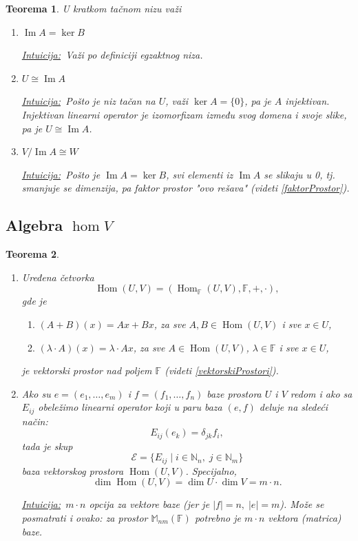 \documentclass[a4paper,12pt,twoside]{report}
\newtheorem{theorem}{Teorema}[section]
\numberwithin{algorithm}{section}
\newcommand{\intuicija}{\noindent\underline{\textit{Intuicija:}}\ }
\begin{document}
\begin{theorem}
    U kratkom tačnom nizu važi
    \begin{enumerate}
        \item $\operatorname{Im} A = \ker B$
        
        \intuicija Važi po definiciji egzaktnog niza.
        \item $U \cong \operatorname{Im} A$
        
        \intuicija Pošto je niz tačan na $U$, važi $\ker A = \{0\}$, pa je $A$ injektivan. Injektivan linearni operator je izomorfizam između svog domena i svoje slike, pa je $U \cong \operatorname{Im} A$.
        
        \item $V/\operatorname{Im} A \cong W$
        
        \intuicija Pošto je $\operatorname{Im} A = \ker B$, svi elementi iz $\operatorname{Im}A$ se slikaju u 0, tj. smanjuje se dimenzija, pa faktor prostor "ovo rešava" (videti \ref{faktorProstor}).
    \end{enumerate}
\end{theorem}

\subsection{Algebra $\hom V$}
\begin{theorem}\
    \begin{enumerate}
        \item Uređena četvorka 
        \[
        \operatorname{Hom}(U, V) = (\operatorname{Hom}_{\mathbb{F}}(U, V), \mathbb{F}, +, \cdot),
        \]
        gde je
        \begin{enumerate}
            \item[(a)] $(A + B)(x) = Ax + Bx$, za sve $A, B \in \operatorname{Hom}(U, V)$ i sve $x \in U$,
            \item[(b)] $(\lambda \cdot A)(x) = \lambda \cdot Ax$, za sve $A \in \operatorname{Hom}(U, V)$, $\lambda \in \mathbb{F}$ i sve $x \in U$,
        \end{enumerate}
        je vektorski prostor nad poljem $\mathbb{F}$ (videti \ref{vektorskiProstori}).
        
        \item Ako su $e = (e_1, \dots, e_m)$ i $f = (f_1, \dots, f_n)$ baze prostora $U$ i $V$ redom i ako sa $E_{ij}$ obeležimo linearni operator koji u paru baza $(e, f)$ deluje na sledeći način:
        \[
        E_{ij}(e_k) = \delta_{jk} f_i,
        \]
        tada je skup
        \[
        \mathcal{E} = \{ E_{ij} \mid i \in\mathbb{N}_n,\; j \in\mathbb{N}_m \}
        \]
        baza vektorskog prostora $\operatorname{Hom}(U, V)$. Specijalno,
        \[
        \dim \operatorname{Hom}(U, V) = \dim U \cdot \dim V = m \cdot n.
        \]

        \intuicija $m \cdot n$ opcija za vektore baze (jer je $|f| = n, \; |e| = m$). Može se posmatrati i ovako: za prostor $\mathbb{M}_{nm}(\mathbb{F})$ potrebno je $m \cdot n$ vektora (matrica) baze.
    \end{enumerate}
\end{theorem}
\end{document}
